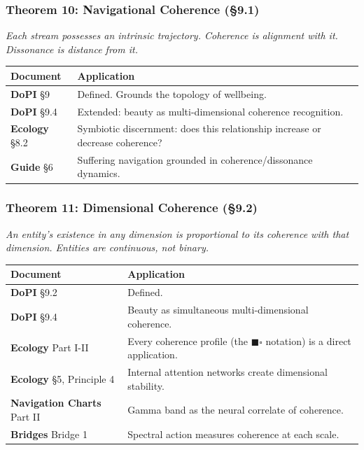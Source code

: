 \subsubsection*{Theorem 10: Navigational Coherence (§9.1)}


\textit{Each stream possesses an intrinsic trajectory. Coherence is alignment with it. Dissonance is distance from it.}



\begin{longtable}{>{\raggedright\arraybackslash}p{} >{\raggedright\arraybackslash}p{}}
\toprule
\textbf{Document} & \textbf{Application} \\
\midrule
\endhead
\textbf{DoPI} §9 & Defined. Grounds the topology of wellbeing. \\
\textbf{DoPI} §9.4 & Extended: beauty as multi-dimensional coherence recognition. \\
\textbf{Ecology} §8.2 & Symbiotic discernment: does this relationship increase or decrease coherence? \\
\textbf{Guide} §6 & Suffering navigation grounded in coherence/\allowbreak dissonance dynamics. \\
\bottomrule
\end{longtable}



\subsubsection*{Theorem 11: Dimensional Coherence (§9.2)}


\textit{An entity's existence in any dimension is proportional to its coherence with that dimension. Entities are continuous, not binary.}



\begin{longtable}{>{\raggedright\arraybackslash}p{} >{\raggedright\arraybackslash}p{}}
\toprule
\textbf{Document} & \textbf{Application} \\
\midrule
\endhead
\textbf{DoPI} §9.2 & Defined. \\
\textbf{DoPI} §9.4 & Beauty as simultaneous multi-dimensional coherence. \\
\textbf{Ecology} Part I-II & Every coherence profile (the $\blacksquare$$\square$ notation) is a direct application. \\
\textbf{Ecology} §5, Principle 4 & Internal attention networks create dimensional stability. \\
\textbf{Navigation Charts} Part II & Gamma band as the neural correlate of coherence. \\
\textbf{Bridges} Bridge 1 & Spectral action measures coherence at each scale. \\
\bottomrule
\end{longtable}



